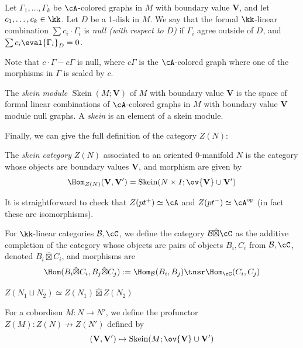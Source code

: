 \documentclass[12pt]{article}
\newcommand{\VV}{{\mathbf{V}}}
\DeclareMathOperator{\Skein}{Skein}
\newcommand{\opp}{{\text{op}}}
\newcommand{\cB}{{\mathcal{B}}}
\newcommand{\hatbox}{{\hat{\boxtimes}}}
\begin{document}
\begin{definition}
\label{d:null-graph}
Let $\Gamma_1,\ldots,\Gamma_k$ be $\cA$-colored graphs in $M$
with boundary value $\VV$,
and let $c_1,\ldots,c_k \in \kk$.
Let $D$ be a 1-disk in $M$.
We say that the formal $\kk$-linear combination
$\sum c_i \cdot \Gamma_i$ is
\emph{null (with respect to $D$)}
if $\Gamma_i$ agree outside of $D$,
and $\sum c_i \eval{\Gamma_i}_D = 0$.
\end{definition}

Note that $c \cdot \Gamma - c\Gamma$ is null,
where $c\Gamma$ is the $\cA$-colored graph
where one of the morphisms in $\Gamma$ is scaled by $c$.

\begin{definition}
\label{d:skein}
The \emph{skein module} $\Skein(M;\VV)$
of $M$ with boundary value $\VV$
is the space of formal linear combinations of
$\cA$-colored graphs in $M$ with boundary value $\VV$
module null graphs.
A \emph{skein} is an element of a skein module.
\end{definition}


Finally, we can give the full definition of the category
$Z(N)$:

\begin{definition}
\label{d:skein-category}
The \emph{skein category} $Z(N)$ associated to an
oriented 0-manifold $N$
is the category whose objects are boundary values $\VV$,
and morphism are given by
\[
\Hom_{Z(N)}(\VV,\VV') = \Skein(N \times I; \ov{\VV} \cup \VV')
\]
\end{definition}

It is straightforward to check that
$Z(pt^+) \simeq \cA$
and $Z(pt^-) \simeq \cA^\opp$
(in fact these are isomorphisms).

\begin{definition}
For $\kk$-linear categories $\cB,\cC$,
we define the category $\cB \hatbox \cC$
as the additive completion of the category
whose objects are pairs of objects $B_i,C_i$ from $\cB,\cC$,
denoted $B_i \hatbox C_i$,
and morphisms are
\[
\Hom(B_i \hatbox C_i, B_j \hatbox C_j)
:=
\Hom_\cB(B_i, B_j) \tnsr \Hom_\cC(C_i, C_j)
\]
\end{definition}


\begin{proposition}
$Z(N_1 \sqcup N_2) \simeq Z(N_1) \hatbox Z(N_2)$
\end{proposition}

\begin{definition}
For a cobordism $M : N \to N'$,
we define the profunctor
$Z(M): Z(N) \nrightarrow Z(N')$
defined by
\[
(\VV, \VV') \mapsto \Skein(M; \ov{\VV} \cup \VV')
\]
\end{definition}
\end{document}
